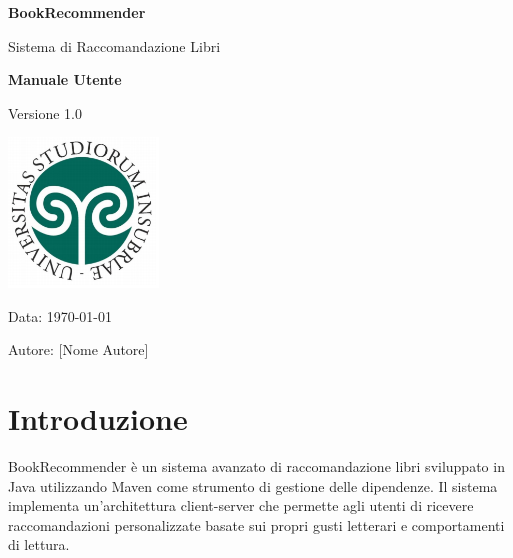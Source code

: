 \documentclass[12pt,a4paper]{article}
\begin{document}
\begin{titlepage}
    \centering
    \vspace*{2cm}
    
    {\Huge\bfseries\color{primaryblue} BookRecommender}
    
    \vspace{1cm}
    
    {\Large Sistema di Raccomandazione Libri}
    
    \vspace{2cm}
    
    {\LARGE\bfseries Manuale Utente}
    
    \vspace{1cm}
    
    {\large Versione 1.0}
    
    \vspace{3cm}
    \includegraphics[width=0.3\textwidth]{Logoinsubria.PNG} %
    
    \vfill
    
    {\large Data: \today}
    
    \vspace{1cm}
    
    {\large Autore: [Nome Autore]}
    
\end{titlepage}

\tableofcontents
\newpage

\section{Introduzione}

BookRecommender è un sistema avanzato di raccomandazione libri sviluppato in Java utilizzando Maven come strumento di gestione delle dipendenze. Il sistema implementa un'architettura client-server che permette agli utenti di ricevere raccomandazioni personalizzate basate sui propri gusti letterari e comportamenti di lettura.
\end{document}

